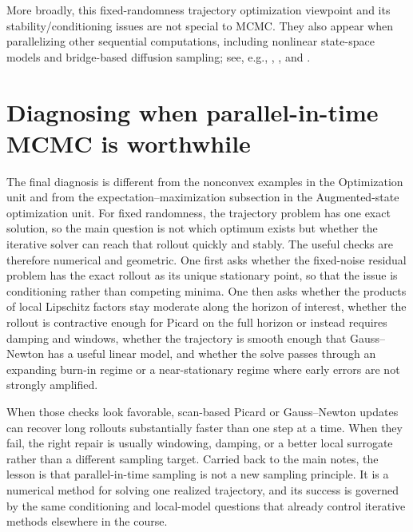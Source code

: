 \documentclass[11pt]{article}
\makeatletter
\def@path{{../../}{../}{Lecture Tex/}}
\makeatother
\begin{document}
More broadly, this fixed-randomness trajectory optimization viewpoint and its stability/conditioning issues are not special to MCMC.
They also appear when parallelizing other sequential computations, including nonlinear state-space models and bridge-based diffusion sampling; see, e.g., \citet[\S3]{lim_zhu_selfridge_kasim_2024_parallelizing_nonlinear_sequential_models}, \citet[\S1]{gonzalez_warrington_smith_linderman_2024_towards_scalable_stable_parallelization_nonlinear_rnns}, and \citet[\S3]{shih_belkhale_ermon_sadigh_anari_2023_parallel_sampling_diffusion}.%

\section{Diagnosing when parallel-in-time MCMC is worthwhile}
\label{sec:parallel-mcmc-diagnostics}

The final diagnosis is different from the nonconvex examples in the Optimization unit and from the expectation--maximization subsection in the Augmented-state optimization unit.
For fixed randomness, the trajectory problem has one exact solution, so the main question is not which optimum exists but whether the iterative solver can reach that rollout quickly and stably.
The useful checks are therefore numerical and geometric.
One first asks whether the fixed-noise residual problem has the exact rollout as its unique stationary point, so that the issue is conditioning rather than competing minima.
One then asks whether the products of local Lipschitz factors stay moderate along the horizon of interest, whether the rollout is contractive enough for Picard on the full horizon or instead requires damping and windows, whether the trajectory is smooth enough that Gauss--Newton has a useful linear model, and whether the solve passes through an expanding burn-in regime or a near-stationary regime where early errors are not strongly amplified.

When those checks look favorable, scan-based Picard or Gauss--Newton updates can recover long rollouts substantially faster than one step at a time.
When they fail, the right repair is usually windowing, damping, or a better local surrogate rather than a different sampling target.
Carried back to the main notes, the lesson is that parallel-in-time sampling is not a new sampling principle.
It is a numerical method for solving one realized trajectory, and its success is governed by the same conditioning and local-model questions that already control iterative methods elsewhere in the course.


\makeatletter
\begingroup
{}\@empty
{}
\endgroup
\makeatother

\end{document}

